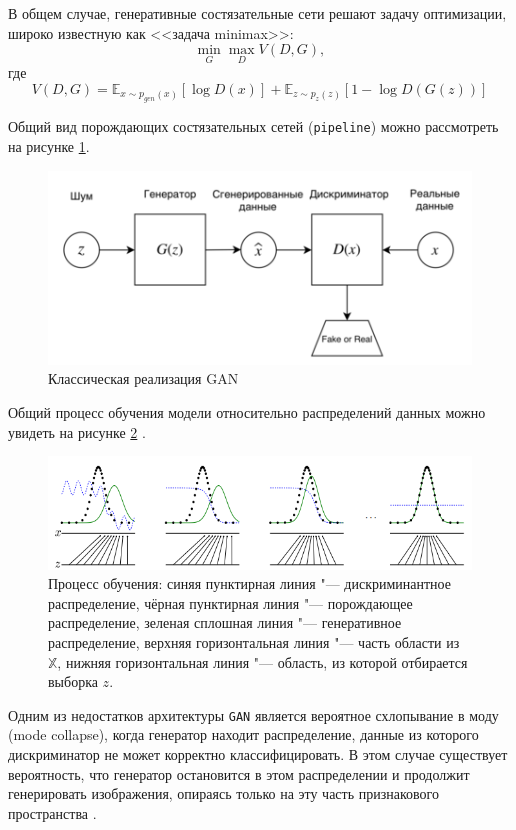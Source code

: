 В общем случае, генеративные состязательные сети решают задачу оптимизации, широко известную как <<задача minimax>>: \cite{nikolenko_dl}
\begin{equation}
    \min\limits_{G}\max\limits_{D}V(D, G),
\end{equation}
где
\begin{equation}
    V(D, G) = \mathbb{E}_{x \sim p_{gen}(x)}[\log D(x)] + \mathbb{E}_{z \sim p_{z}(z)}[1 - \log D(G(z))]
\end{equation}

Общий вид порождающих состязательных сетей (\texttt{pipeline}) можно рассмотреть на рисунке \ref{fig:gan_overview}\cite{gan_intro}.

\begin{figure}[H]
    \centering
    \includegraphics[width=0.7\linewidth]{images/gan_overview.png}
    \caption{Классическая реализация GAN}
    \label{fig:gan_overview}
\end{figure}

Общий процесс обучения модели относительно распределений данных можно увидеть на рисунке \ref{fig:gan_train} \cite{gan_intro}.
\begin{figure}[H]
    \centering
    \includegraphics[width=0.9\linewidth]{images/gan_train.png}
    \caption{Процесс обучения: синяя пунктирная линия "--- дискриминантное распределение, чёрная пунктирная линия "--- порождающее распределение, зеленая сплошная линия "--- генеративное распределение, верхняя горизонтальная линия "--- часть области из $\mathbb{X}$, нижняя горизонтальная линия "--- область, из которой отбирается выборка $z$.}
    \label{fig:gan_train}
\end{figure}

Одним из недостатков архитектуры \texttt{GAN} является вероятное схлопывание в моду (mode collapse), когда генератор находит распределение, данные из которого дискриминатор не может корректно классифицировать. В этом случае существует вероятность, что генератор остановится в этом распределении и продолжит генерировать изображения, опираясь только на эту часть признакового пространства \cite{gan_intro}.

